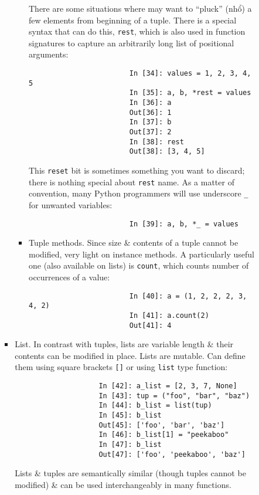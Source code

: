 \documentclass{article}
\begin{document}
\begin{enumerate}
\begin{itemize}
\begin{itemize}
\begin{itemize}
\begin{itemize}
					There are some situations where may want to ``pluck'' (nhổ) a few elements from beginning of a tuple. There is a special syntax that can do this, {\tt*rest}, which is also used in function signatures to capture an arbitrarily long list of positional arguments:
					\begin{verbatim}
						In [34]: values = 1, 2, 3, 4, 5
						In [35]: a, b, *rest = values
						In [36]: a
						Out[36]: 1
						In [37]: b
						Out[37]: 2
						In [38]: rest
						Out[38]: [3, 4, 5]
					\end{verbatim}
					This {\tt reset} bit is sometimes something you want to discard; there is nothing special about {\tt rest} name. As a matter of convention, many Python programmers will use underscore \verb|_| for unwanted variables:
					\begin{verbatim}
						In [39]: a, b, *_ = values
					\end{verbatim}
					\item {\sf Tuple methods.}  Since size \& contents of a tuple cannot be modified, very light on instance methods. A particularly useful one (also available on lists) is {\tt count}, which counts number of occurrences of a value:
					\begin{verbatim}
						In [40]: a = (1, 2, 2, 2, 3, 4, 2)
						In [41]: a.count(2)
						Out[41]: 4
					\end{verbatim}
				\end{itemize}
				\item {\sf List.} In contrast with tuples, lists are variable length \& their contents can be modified in place. Lists are mutable. Can define them using square brackets {\tt[]} or using {\tt list} type function:
				\begin{verbatim}
					In [42]: a_list = [2, 3, 7, None]
					In [43]: tup = ("foo", "bar", "baz")
					In [44]: b_list = list(tup)
					In [45]: b_list
					Out[45]: ['foo', 'bar', 'baz']
					In [46]: b_list[1] = "peekaboo"
					In [47]: b_list
					Out[47]: ['foo', 'peekaboo', 'baz']
				\end{verbatim}
				Lists \& tuples are semantically similar (though tuples cannot be modified) \& can be used interchangeably in many functions.
				

\end{itemize}
\end{itemize}
\end{itemize}
\end{enumerate}
\end{document}
